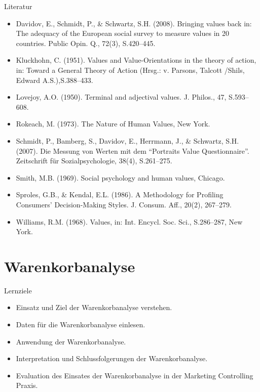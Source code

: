 \documentclass[12pt,ngerman,a4paper,ignorenonframetext,]{beamer}
\providecommand{\tightlist}{%
  \setlength{\itemsep}{0pt}\setlength{\parskip}{0pt}}
\begin{document}
\begin{frame}{Literatur}
\protect\hypertarget{literatur-4}{}

\begin{itemize}
\tightlist
\item
  Davidov, E., Schmidt, P., \& Schwartz, S.\thinspace{}H. (2008).
  Bringing values back in: The adequacy of the European social survey to
  measure values in 20 countries. Public Opin. Q., 72(3),
  S.\thinspace{}420--445.
\item
  Kluckhohn, C. (1951). Values and Value-Orientations in the theory of
  action, in: Toward a General Theory of Action (Hrsg.: v. Parsons,
  Talcott /\thinspace{}Shils, Edward
  \mbox{A.\thinspace{}S.),}\xspace{}\thinspace{}S.\thinspace{}388--433.
\item
  Lovejoy, A.\thinspace{}O. (1950). Terminal and adjectival values. J.
  Philos., 47, S.\thinspace{}593--608.
\item
  Rokeach, M. (1973). The Nature of Human Values, New York.
\item
  Schmidt, P., Bamberg, S., Davidov, E., Herrmann, J., \& Schwartz,
  S.\thinspace{}H. (2007). Die Messung von Werten mit dem ``Portraits
  Value Questionnaire''. Zeitschrift für Sozialpsychologie, 38(4),
  S.\thinspace{}261--275.
\item
  Smith, M.\thinspace{}B. (1969). Social psychology and human values,
  Chicago.
\item
  Sproles, G.\thinspace{}B., \& Kendal, E.\thinspace{}L. (1986). A
  Methodology for Profiling Consumers' Decision-Making Styles. J.
  Consum. Aff., 20(2), 267--279.
\item
  Williams, R.\thinspace{}M. (1968). Values, in: Int. Encycl. Soc. Sci.,
  S.\thinspace{}286--287, New York.
\end{itemize}

\end{frame}

\hypertarget{warenkorbanalyse}{%
\section{Warenkorbanalyse}\label{warenkorbanalyse}}

\begin{frame}{Lernziele}
\protect\hypertarget{lernziele-8}{}

\begin{itemize}
\tightlist
\item
  Einsatz und Ziel der Warenkorbanalyse verstehen.
\item
  Daten für die Warenkorbanalyse einlesen.
\item
  Anwendung der Warenkorbanalyse.
\item
  Interpretation und Schlussfolgerungen der Warenkorbanalyse.
\item
  Evaluation des Einsates der Warenkorbanalyse in der Marketing
  Controlling Praxis.
\end{itemize}

\end{frame}
\end{document}
